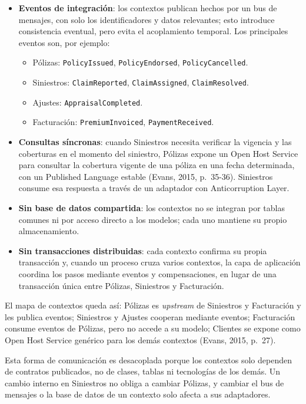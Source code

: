 \documentclass[12pt,a4paper]{article}
\begin{document}
\begin{itemize}[label=$\cdot$]
  \item \textbf{Eventos de integración}: los contextos publican hechos por un bus de mensajes, con solo los identificadores y datos relevantes; esto introduce consistencia eventual, pero evita el acoplamiento temporal. Los principales eventos son, por ejemplo:
  \begin{itemize}[label=$\cdot$]
    \item Pólizas: \texttt{PolicyIssued}, \texttt{PolicyEndorsed}, \texttt{PolicyCancelled}.
    \item Siniestros: \texttt{ClaimReported}, \texttt{ClaimAssigned}, \texttt{ClaimResolved}.
    \item Ajustes: \texttt{AppraisalCompleted}.
    \item Facturación: \texttt{PremiumInvoiced}, \texttt{PaymentReceived}.
  \end{itemize}
  \item \textbf{Consultas síncronas}: cuando Siniestros necesita verificar la vigencia y las coberturas en el momento del siniestro, Pólizas expone un Open Host Service para consultar la cobertura vigente de una póliza en una fecha determinada, con un Published Language estable (Evans, 2015, p.~35-36). Siniestros consume esa respuesta a través de un adaptador con Anticorruption Layer.
  \item \textbf{Sin base de datos compartida}: los contextos no se integran por tablas comunes ni por acceso directo a los modelos; cada uno mantiene su propio almacenamiento.
  \item \textbf{Sin transacciones distribuidas}: cada contexto confirma su propia transacción y, cuando un proceso cruza varios contextos, la capa de aplicación coordina los pasos mediante eventos y compensaciones, en lugar de una transacción única entre Pólizas, Siniestros y Facturación.
\end{itemize}

El mapa de contextos queda así: Pólizas es \textit{upstream} de Siniestros y Facturación y les publica eventos; Siniestros y Ajustes cooperan mediante eventos; Facturación consume eventos de Pólizas, pero no accede a su modelo; Clientes se expone como Open Host Service genérico para los demás contextos (Evans, 2015, p.~27).

Esta forma de comunicación es desacoplada porque los contextos solo dependen de contratos publicados, no de clases, tablas ni tecnologías de los demás. Un cambio interno en Siniestros no obliga a cambiar Pólizas, y cambiar el bus de mensajes o la base de datos de un contexto solo afecta a sus adaptadores.
\end{document}
